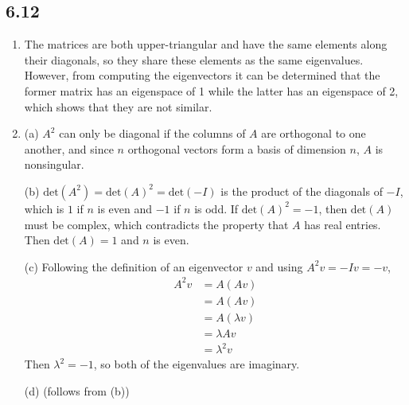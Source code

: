 \documentclass[a4paper, 12pt]{article}
\begin{document}
	\subsection*{6.12}
	\begin{enumerate}
		\item The matrices are both upper-triangular and have the same elements along their diagonals, so they share these elements as the same eigenvalues. However, from computing the eigenvectors it can be determined that the former matrix has an eigenspace of 1 while the latter has an eigenspace of 2, which shows that they are not similar.
		
		\setcounter{enumi}{7}
		\item (a) $A^2$ can only be diagonal if the columns of $A$ are orthogonal to one another, and since $n$ orthogonal vectors form a basis of dimension $n$, $A$ is nonsingular. \par
		(b) $\mbox{det}(A^2) = \mbox{det}(A)^2 = \mbox{det}(-I)$ is the product of the diagonals of $-I$, which is $1$ if $n$ is even and $-1$ if $n$ is odd. If $\mbox{det}(A)^2 = -1$, then $\mbox{det}(A)$ must be complex, which contradicts the property that $A$ has real entries. Then $\mbox{det}(A) = 1$ and $n$ is even. \par
		(c) Following the definition of an eigenvector $v$ and using $A^2v = -Iv = -v$,
		\begin{align*}
		A^2v &= A(Av) \\
		&= A(Av) \\
		&= A(\lambda v) \\
		&= \lambda Av \\
		&= \lambda^2v
		\end{align*}
		Then $\lambda^2 = -1$, so both of the eigenvalues are imaginary. \par
		(d) (follows from (b))
	\end{enumerate}
\end{document}
